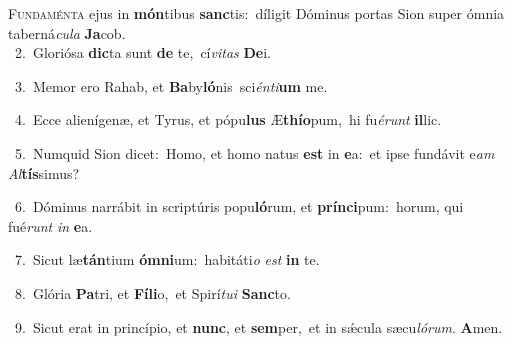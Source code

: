 \lettrine{\initial\textcolor{\initialcolor}{F}}{undaménta} ejus in \textbf{món}\-tibus \textbf{sanc}\-tis:~\star díligit Dóminus portas Sion super ómnia taberná\-\textit{cu}\-\textit{la} \textbf{Ja}\-cob.\\
{\numbfont\textcolor{\numbcolor}{~2.}}~Gloriósa \textbf{dic}\-ta sunt \textbf{de} te,~\star cí\-\textit{vi}\-\textit{tas} \textbf{De}\-i.\par
{\numbfont\textcolor{\numbcolor}{~3.}}~Memor ero Rahab, et \textbf{Ba}\-by\-\textbf{ló}\-nis~\star sci\-\textit{én}\-\textit{ti}\textbf{um} me.\par
{\numbfont\textcolor{\numbcolor}{~4.}}~Ecce alienígenæ, et Tyrus, et pópu\textbf{lus} Æ\-\textbf{thí}\-\textbf{o}pum,~\star hi fu\-\textit{é}\-\textit{runt} \textbf{il}\-lic.\par
{\numbfont\textcolor{\numbcolor}{~5.}}~Numquid Sion dicet:~\dagger Homo, et homo natus \textbf{est} in \textbf{e}\-a:~\star et ipse fundávit e\textit{am} \textit{Al}\-\textbf{tís}simus?\par
{\numbfont\textcolor{\numbcolor}{~6.}}~Dóminus narrábit in scriptúris popu\-\textbf{ló}\-rum, et \textbf{prín}\-\textbf{ci}pum:~\star horum, qui fué\textit{runt} \textit{in} \textbf{e}\-a.\par
{\numbfont\textcolor{\numbcolor}{~7.}}~Sicut læ\-\textbf{tán}\-tium \textbf{óm}\-\textbf{ni}um:~\star habitáti\textit{o} \textit{est} \textbf{in} te.\par
{\numbfont\textcolor{\numbcolor}{~8.}}~Glória \textbf{Pa}\-tri, et \textbf{Fí}\-\textbf{li}o,~\star et Spirí\-\textit{tu}\-\textit{i} \textbf{Sanc}\-to.\par
{\numbfont\textcolor{\numbcolor}{~9.}}~Sicut erat in princípio, et \textbf{nunc}\-, et \textbf{sem}\-per,~\star et in sǽcula sæcu\-\textit{ló}\-\textit{rum}. \textbf{A}\-men.\par
